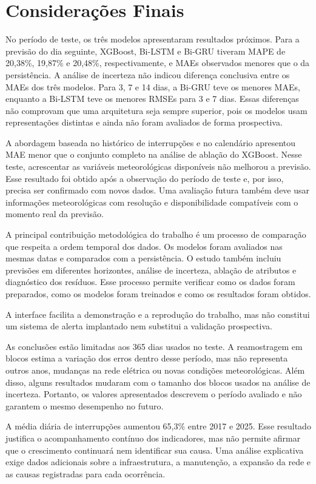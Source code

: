 \section{Considerações Finais}

No período de teste, os três modelos apresentaram resultados próximos. Para a previsão do dia seguinte, XGBoost, Bi-LSTM e Bi-GRU tiveram MAPE de 20,38\%, 19,87\% e 20,48\%, respectivamente, e MAEs observados menores que o da persistência. A análise de incerteza não indicou diferença conclusiva entre os MAEs dos três modelos. Para 3, 7 e 14 dias, a Bi-GRU teve os menores MAEs, enquanto a Bi-LSTM teve os menores RMSEs para 3 e 7 dias. Essas diferenças não comprovam que uma arquitetura seja sempre superior, pois os modelos usam representações distintas e ainda não foram avaliados de forma prospectiva.

A abordagem baseada no histórico de interrupções e no calendário apresentou MAE menor que o conjunto completo na análise de ablação do XGBoost. Nesse teste, acrescentar as variáveis meteorológicas disponíveis não melhorou a previsão. Esse resultado foi obtido após a observação do período de teste e, por isso, precisa ser confirmado com novos dados. Uma avaliação futura também deve usar informações meteorológicas com resolução e disponibilidade compatíveis com o momento real da previsão.

A principal contribuição metodológica do trabalho é um processo de comparação que respeita a ordem temporal dos dados. Os modelos foram avaliados nas mesmas datas e comparados com a persistência. O estudo também incluiu previsões em diferentes horizontes, análise de incerteza, ablação de atributos e diagnóstico dos resíduos. Esse processo permite verificar como os dados foram preparados, como os modelos foram treinados e como os resultados foram obtidos.

A interface facilita a demonstração e a reprodução do trabalho, mas não constitui um sistema de alerta implantado nem substitui a validação prospectiva.

As conclusões estão limitadas aos 365 dias usados no teste. A reamostragem em blocos estima a variação dos erros dentro desse período, mas não representa outros anos, mudanças na rede elétrica ou novas condições meteorológicas. Além disso, alguns resultados mudaram com o tamanho dos blocos usados na análise de incerteza. Portanto, os valores apresentados descrevem o período avaliado e não garantem o mesmo desempenho no futuro.

A média diária de interrupções aumentou 65,3\% entre 2017 e 2025. Esse resultado justifica o acompanhamento contínuo dos indicadores, mas não permite afirmar que o crescimento continuará nem identificar sua causa. Uma análise explicativa exige dados adicionais sobre a infraestrutura, a manutenção, a expansão da rede e as causas registradas para cada ocorrência.


